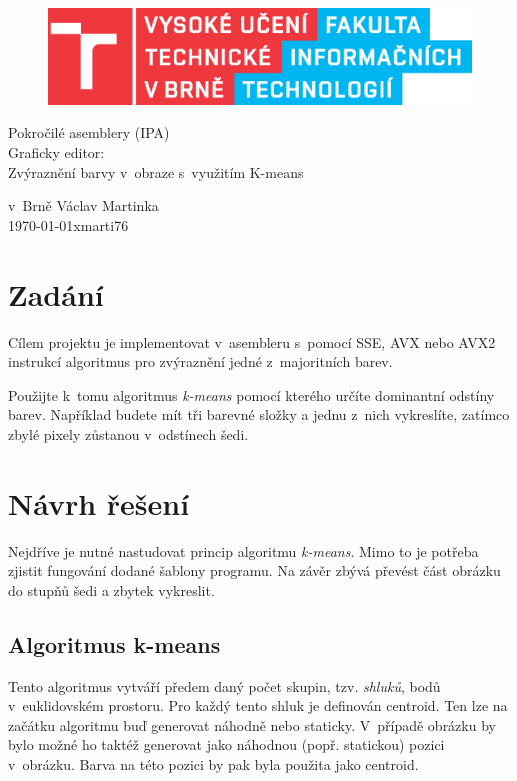 \documentclass[11pt,a4paper,onecolumn,notitlepage]{article}
\begin{document}
	\begin{center}
		\begin{figure}[hb]
			\centering
			\includegraphics{FIT.eps}
			\label{fig:FIT}
		\end{figure}
	\LARGE
		Pokročilé asemblery (IPA)\\
	\Huge
		Graficky editor:\\
		Zvýraznění barvy v~obraze s~využitím K-means\\
	\end{center}

{\Large v~Brně \hfill Václav Martinka\\
	\today \hfill xmarti76}

\newpage

\tableofcontents

\newpage


\section{Zadání}
	Cílem projektu je implementovat v asembleru s pomocí SSE, AVX nebo AVX2 instrukcí algoritmus pro zvýraznění jedné z~majoritních barev.
	
	Použijte k~tomu algoritmus \emph{k-means} pomocí kterého určíte dominantní odstíny barev. Například budete mít tři barevné složky a jednu z~nich vykreslíte, zatímco zbylé pixely zůstanou v~odstínech šedi.
	

\section{Návrh řešení}
	Nejdříve je nutné nastudovat princip algoritmu \emph{k-means}. Mimo to je potřeba zjistit fungování dodané šablony programu. Na závěr zbývá převést část obrázku do stupňů šedi a zbytek vykreslit.

	\subsection{Algoritmus k-means}
		Tento algoritmus vytváří předem daný počet skupin, tzv. \emph{shluků}, bodů v~euklidovském prostoru. Pro každý tento shluk je definován centroid. Ten lze na začátku algoritmu buď generovat náhodně nebo staticky. V~případě obrázku by bylo možné ho taktéž generovat jako náhodnou (popř. statickou) pozici v~obrázku. Barva na této pozici by pak byla použita jako centroid.
	
\end{document}
